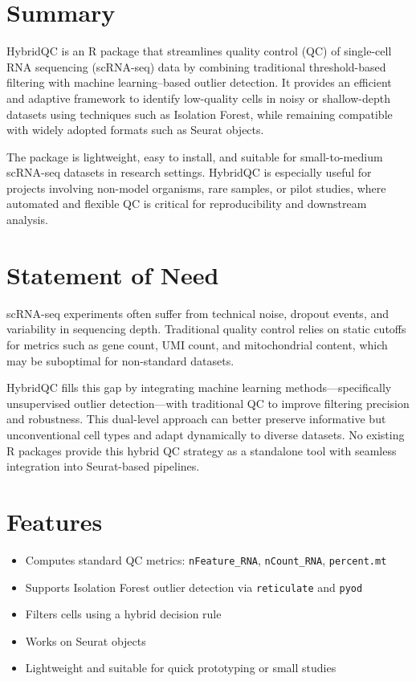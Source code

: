 \section{Summary}\label{summary}

HybridQC is an R package that streamlines quality control (QC) of
single-cell RNA sequencing (scRNA-seq) data by combining traditional
threshold-based filtering with machine learning--based outlier
detection. It provides an efficient and adaptive framework to identify
low-quality cells in noisy or shallow-depth datasets using techniques
such as Isolation Forest, while remaining compatible with widely adopted
formats such as Seurat objects.

The package is lightweight, easy to install, and suitable for
small-to-medium scRNA-seq datasets in research settings. HybridQC is
especially useful for projects involving non-model organisms, rare
samples, or pilot studies, where automated and flexible QC is critical
for reproducibility and downstream analysis.

\section{Statement of Need}\label{statement-of-need}

scRNA-seq experiments often suffer from technical noise, dropout events,
and variability in sequencing depth. Traditional quality control relies
on static cutoffs for metrics such as gene count, UMI count, and
mitochondrial content, which may be suboptimal for non-standard
datasets.

HybridQC fills this gap by integrating machine learning
methods---specifically unsupervised outlier detection---with traditional
QC to improve filtering precision and robustness. This dual-level
approach can better preserve informative but unconventional cell types
and adapt dynamically to diverse datasets. No existing R packages
provide this hybrid QC strategy as a standalone tool with seamless
integration into Seurat-based pipelines.

\section{Features}\label{features}

\begin{itemize}
\tightlist
\item
  Computes standard QC metrics: \texttt{nFeature\_RNA},
  \texttt{nCount\_RNA}, \texttt{percent.mt}
\item
  Supports Isolation Forest outlier detection via \texttt{reticulate}
  and \texttt{pyod}
\item
  Filters cells using a hybrid decision rule
\item
  Works on Seurat objects
\item
  Lightweight and suitable for quick prototyping or small studies
\end{itemize}

